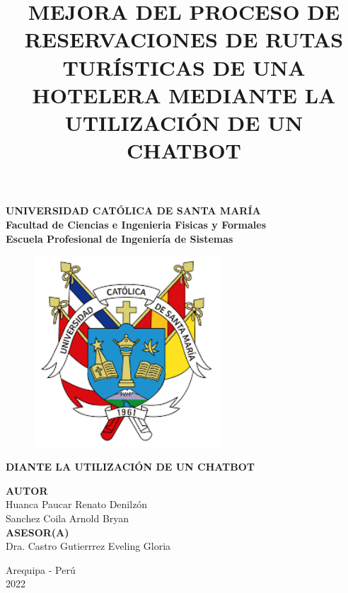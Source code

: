\documentclass[12pt,a4paper,oneside]{report}
\begin{document}
\begin{titlepage}
\begin{center}
 {\Large \bf UNIVERSIDAD CATÓLICA DE SANTA MARÍA}\\
  \vspace{8mm} 
  {\Large \bf Facultad de Ciencias e Ingenieria Fisicas y Formales}\\
  \vspace{8mm}
  {\Large \bf Escuela Profesional de Ingeniería de Sistemas}\\
 \begin{figure}[H]
    \centering
    \includegraphics[width=7cm]{imagenes/logo de la catolica.png}
\end{figure}
\title{MEJORA DEL PROCESO DE RESERVACIONES DE RUTAS TURÍSTICAS DE UNA HOTELERA MEDIANTE LA UTILIZACIÓN DE UN CHATBOT} %
{\Large \bf }
\vspace{1cm}
{\bf DIANTE LA UTILIZACIÓN DE UN CHATBOT}\\[1.0cm]
\begin{flushright}
{\bf AUTOR}\\[0.5cm]
{Huanca Paucar Renato Denilzón}\\[0.5cm] %
{Sanchez Coila Arnold Bryan}\\[1.0cm]

{\bf ASESOR(A)}\\[0.5 cm] 
{Dra. Castro Gutierrrez Eveling Gloria}\\[0.5 cm] %
\end{flushright}
\vspace{1cm}
{Arequipa - Perú}\\[0.5cm]
{2022}
\end{center}
\end{titlepage}
\end{document}
